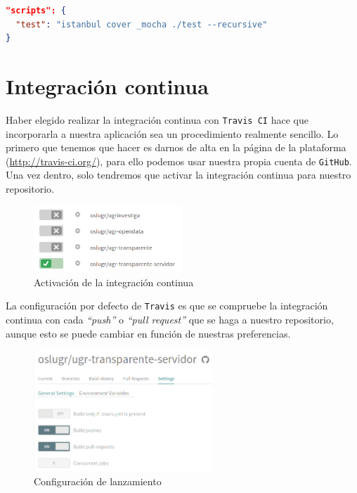 \newpage
\begin{lstlisting}[language=json,caption={Scripts de test},label={lst:test}]
"scripts": {
  "test": "istanbul cover _mocha ./test --recursive"
}
\end{lstlisting}

\section{Integración continua}

Haber elegido realizar la integración continua con {\tt Travis CI} hace que incorporarla a nuestra aplicación sea un procedimiento realmente sencillo. Lo primero que tenemos que hacer es darnos de alta en la página de la plataforma (\url{http://travis-ci.org/}), para ello podemos usar nuestra propia cuenta de {\tt GitHub}. Una vez dentro, solo tendremos que activar la integración continua para nuestro repositorio.

\begin{figure}[!ht]
	\begin{center}
		\includegraphics[width=0.5\textwidth]{../images/activar_travis.png}
		\caption{Activación de la integración continua}
		\label{fig:activar_travis}
	\end{center}
\end{figure}

La configuración por defecto de {\tt Travis} es que se compruebe la integración continua con cada \textit{``push''} o \textit{``pull request''} que se haga a nuestro repositorio, aunque esto se puede cambiar en función de nuestras preferencias.

\begin{figure}[!ht]
	\begin{center}
		\includegraphics[width=0.6\textwidth]{../images/config_travis.png}
		\caption{Configuración de lanzamiento}
		\label{fig:config_travis}
	\end{center}
\end{figure}

